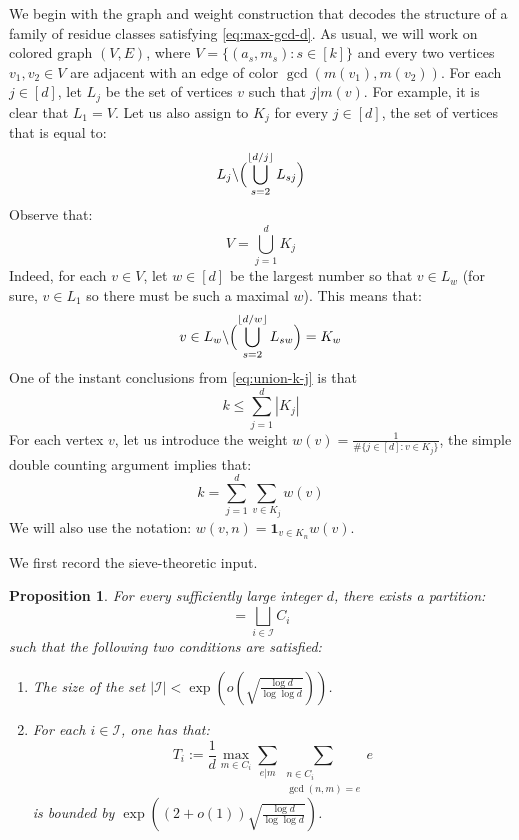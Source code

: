 \documentclass[11pt]{amsart}
\newtheorem{prop}[thm]{Proposition}
\theoremstyle{remark}
\begin{document}
We begin with the graph and weight construction that decodes the structure of a family of residue classes satisfying \eqref{eq:max-gcd-d}. As usual, we will work on colored graph $(V, E)$, where $V = \{(a_s, m_s) : s \in [k] \}$ and every two vertices $v_1, v_2 \in V$ are adjacent with an edge of color $\gcd(m(v_1), m(v_2))$. For each $j \in [d]$, let $L_j$ be the set of vertices $v$ such that $j | m(v)$. For example, it is clear that $L_1 = V$. Let us also assign to $K_j$ for every $j \in [d]$, the set of vertices that is equal to:
\begin{equation}
  L_j \backslash \Bigl( \bigcup_{s = 2}^{\lfloor d/j \rfloor} L_{sj} \Bigr)
\end{equation}
Observe that:
\begin{equation} \label{eq:union-k-j}
  V = \bigcup_{j = 1}^d K_j
\end{equation}
Indeed, for each $v \in V$, let $w \in [d]$ be the largest number so that $v \in L_w$ (for sure, $v \in L_1$ so there must be such a maximal $w$). This means that:
\begin{equation} 
    v \in L_w \backslash \Bigl( \bigcup_{s = 2}^{\lfloor d/w \rfloor} L_{sw} \Bigr) = K_w
\end{equation}
One of the instant conclusions from \eqref{eq:union-k-j} is that 
\begin{equation}
  k \leq \sum_{j = 1}^d |K_j|
\end{equation}
For each vertex $v$, let us introduce the weight $w(v) = \frac{1}{\# \{j \in [d] : v \in K_j \} }$, the simple double counting argument implies that:
\begin{equation}
  k = \sum_{j = 1}^d \sum_{v \in K_j} w(v)
\end{equation}
We will also use the notation: $w(v, n) = \mathbf{1}_{v \in K_n} w(v)$.

We first record the sieve-theoretic input.
\begin{prop} \label{prop:sieve-theoretic-partition}
  For every sufficiently large integer $d$, there exists a partition:
  \begin{equation}
    [d] = \bigsqcup_{i \in \mathcal{I}} C_i
  \end{equation}
  such that the following two conditions are satisfied:
  \begin{enumerate}
    \item The size of the set $|\mathcal{I}| < \exp(o(\sqrt{\frac{\log d}{\log \log d}}))$.
    \item For each $i \in \mathcal{I}$, one has that:
    \begin{equation}\label{eq:Ti-definition}
      T_i := \frac{1}{d} \max_{m \in C_i} \sum_{e | m} \sum_{\substack{n \in C_i \\ \gcd(n, m) = e}} e
    \end{equation}
    is bounded by $\exp((2 + o(1)) \sqrt{\frac{\log d}{\log \log d}})$.
  \end{enumerate}
\end{prop}
\end{document}
